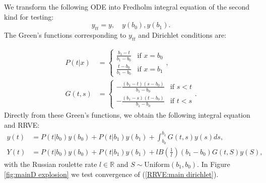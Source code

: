 \documentclass[a4paper,12pt]{article}
\begin{document}
\begin{example}[Dirichlet $y_{tt}=y$] \label{main dirichlet}
  We transform the following ODE into Fredholm integral equation of
  the second kind for testing:
  \begin{equation} \label{eq:main dirichlet}
    y_{tt}=y, \quad y(b_{0}),y(b_{1}).
  \end{equation}
  The Green's functions corresponding to $y_{tt}$ and Dirichlet conditions are:

  \begin{align}
    P(t|x) & = \begin{cases}
                 \frac{b_{1}-t}{b_{1}-b_{0}} & \text{if } x = b_{0} \\
                 \frac{t-b_{0}}{b_{1}-b_{0}} & \text{if } x = b_{1}
               \end{cases},       \\
    G(t,s) & = \begin{cases}
                 -\frac{(b_{1}-t)(s-b_{0})}{b_{1}-b_{0}} & \text{if } s<t \\
                 -\frac{(b_{1}-s)(t-b_{0})}{b_{1}-b_{0}} & \text{if } t<s
               \end{cases}.
  \end{align}
  Directly from these Green's functions, we obtain the following integral equation and RRVE:
  \begin{align} \label{inteq:main dirichlet}
    y(t) & = P(t|b_{0}) y(b_{0}) + P(t|b_{1}) y(b_{1}) +
    \int_{b_{0}}^{b_{1}} G(t,s)y(s) ds,                  \\
    Y(t) & = P(t|b_{0}) y(b_{0}) + P(t|b_{1}) y(b_{1})
    + l B\left(\frac{1}{l} \right)(b_{1}-b_{0}) G(t,S)y(S) , \label{RRVE:main dirichlet}
  \end{align}
  with the Russian roulette rate $l \in \mathbb{R}$  and
  $S \sim \text{Uniform}(b_{1},b_{0})$. In Figure \ref{fig:mainD explosion}
  we test convergence of (\ref{RRVE:main dirichlet}).
\end{example}
\end{document}
